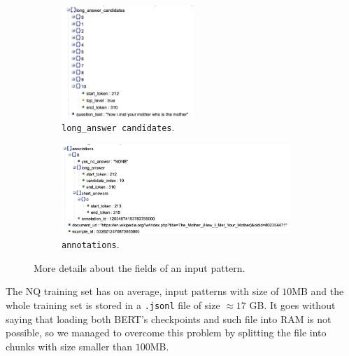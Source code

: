 \documentclass[10pt,hidelinks]{article}
\begin{document}
\begin{figure}[ht]
	\begin{subfigure}{.45\textwidth}
		\centering
		\includegraphics[width=0.55\textwidth]{pics/long_answer_candidates.png}
		\caption{\texttt{long\_answer candidates}.}\label{fig:long_answer_candidates}
	\end{subfigure}
	\begin{subfigure}{.55\textwidth}
		\centering
		\includegraphics[width=0.95\textwidth]{pics/annotations.png}
		\caption{\texttt{annotations}.}\label{fig:annotations}
	\end{subfigure}
	\caption{More details about the fields of an input pattern.}
	\label{fig:json_zoomed}
\end{figure}



The NQ training set has on average, input patterns with size of $10$MB and the whole training set is stored in a \texttt{.jsonl} file of size $\approx 17$ GB.
It goes without saying that loading both BERT's checkpoints and such file into RAM is not possible, so we managed to overcome this problem by splitting the file into chunks with size smaller than $100$MB.
\end{document}
